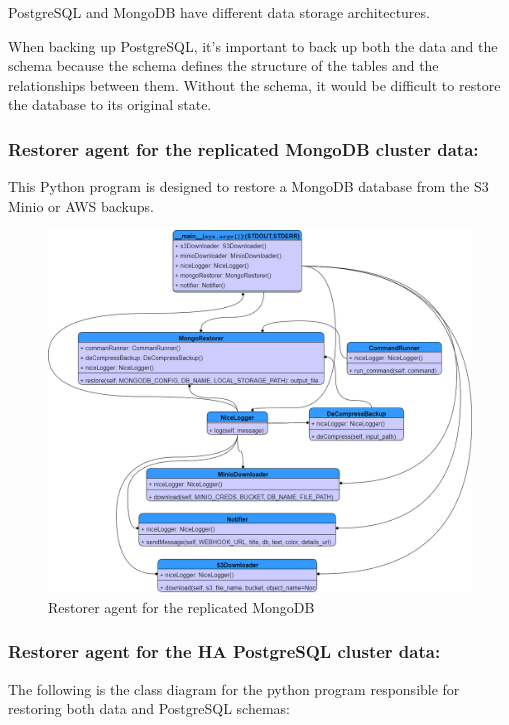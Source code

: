 PostgreSQL and MongoDB have different data storage architectures.  

When backing up PostgreSQL, it's important to back up both the data and the schema because the schema defines the structure of the tables and the relationships between them. Without the schema, it would be difficult to restore the database to its original state. 

\subsubsection{Restorer agent for the replicated MongoDB cluster data: }

This Python program is designed to restore a MongoDB database from the S3 Minio or AWS backups. 

\begin{figure}[H]\centering
\includegraphics[width=1.0\textwidth,angle=00]{assets/f60.png}
\caption{Restorer agent for the replicated MongoDB }
\label{fig:f60}
\end{figure}

\subsubsection{Restorer agent for the HA PostgreSQL cluster data: }

The following is the class diagram for the python program responsible for restoring both data and PostgreSQL schemas: 

